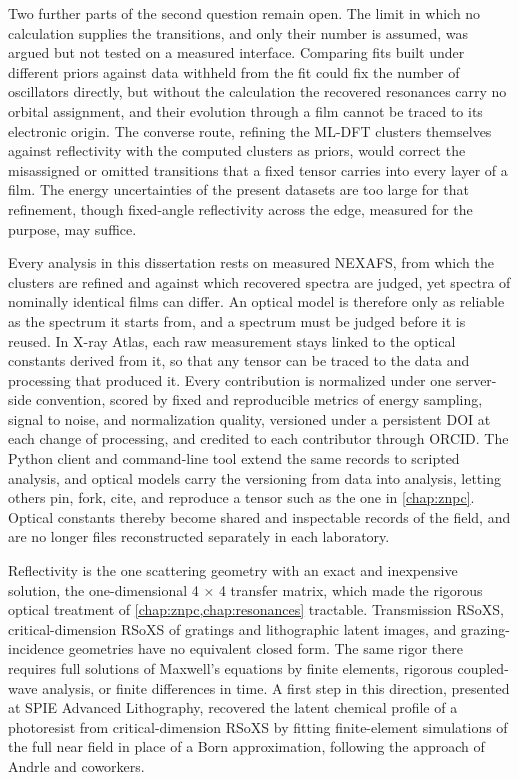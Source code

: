 Two further parts of the second question remain open. The limit in which no calculation supplies the transitions, and only their number is assumed, was argued but not tested on a measured interface. Comparing fits built under different priors against data withheld from the fit could fix the number of oscillators directly, but without the calculation the recovered resonances carry no orbital assignment, and their evolution through a film cannot be traced to its electronic origin. The converse route, refining the ML-DFT clusters themselves against reflectivity with the computed clusters as priors, would correct the misassigned or omitted transitions that a fixed tensor carries into every layer of a film. The energy uncertainties of the present datasets are too large for that refinement, though fixed-angle reflectivity across the edge, measured for the purpose, may suffice.

Every analysis in this dissertation rests on measured NEXAFS, from which the clusters are refined and against which recovered spectra are judged, yet spectra of nominally identical films can differ. An optical model is therefore only as reliable as the spectrum it starts from, and a spectrum must be judged before it is reused. In X-ray Atlas, each raw measurement stays linked to the optical constants derived from it, so that any tensor can be traced to the data and processing that produced it. Every contribution is normalized under one server-side convention, scored by fixed and reproducible metrics of energy sampling, signal to noise, and normalization quality, versioned under a persistent DOI at each change of processing, and credited to each contributor through ORCID. The Python client and command-line tool extend the same records to scripted analysis, and optical models carry the versioning from data into analysis, letting others pin, fork, cite, and reproduce a tensor such as the one in \cref{chap:znpc}. Optical constants thereby become shared and inspectable records of the field, and are no longer files reconstructed separately in each laboratory.

Reflectivity is the one scattering geometry with an exact and inexpensive solution, the one-dimensional 4 × 4 transfer matrix, which made the rigorous optical treatment of \cref{chap:znpc,chap:resonances} tractable. Transmission RSoXS, critical-dimension RSoXS of gratings and lithographic latent images, and grazing-incidence geometries have no equivalent closed form. The same rigor there requires full solutions of Maxwell's equations by finite elements, rigorous coupled-wave analysis, or finite differences in time. A first step in this direction, presented at SPIE Advanced Lithography, recovered the latent chemical profile of a photoresist from critical-dimension RSoXS by fitting finite-element simulations of the full near field in place of a Born approximation, following the approach of Andrle and coworkers.\autocite{andrleNanostructureCharacterizationRSoXS2026,andrleUsingFEMbasedMaxwell2025a,liPatternenhancedResonantSoft2026}


